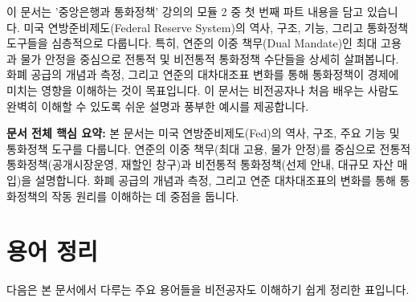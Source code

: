 \documentclass[11pt,a4paper]{book}
\theoremstyle{definition}
\begin{document}
이 문서는 '중앙은행과 통화정책' 강의의 모듈 2 중 첫 번째 파트 내용을 담고 있습니다.
미국 연방준비제도(Federal Reserve System)의 역사, 구조, 기능, 그리고 통화정책 도구들을 심층적으로 다룹니다.
특히, 연준의 이중 책무(Dual Mandate)인 최대 고용과 물가 안정을 중심으로 전통적 및 비전통적 통화정책 수단들을 상세히 살펴봅니다.
화폐 공급의 개념과 측정, 그리고 연준의 대차대조표 변화를 통해 통화정책이 경제에 미치는 영향을 이해하는 것이 목표입니다.
이 문서는 비전공자나 처음 배우는 사람도 완벽히 이해할 수 있도록 쉬운 설명과 풍부한 예시를 제공합니다.

\vspace{1em}

\begin{summarybox}
\textbf{문서 전체 핵심 요약:}
본 문서는 미국 연방준비제도(Fed)의 역사, 구조, 주요 기능 및 통화정책 도구를 다룹니다.
연준의 이중 책무(최대 고용, 물가 안정)를 중심으로 전통적 통화정책(공개시장운영, 재할인 창구)과 비전통적 통화정책(선제 안내, 대규모 자산 매입)을 설명합니다.
화폐 공급의 개념과 측정, 그리고 연준 대차대조표의 변화를 통해 통화정책의 작동 원리를 이해하는 데 중점을 둡니다.
\end{summarybox}

\section{용어 정리}

다음은 본 문서에서 다루는 주요 용어들을 비전공자도 이해하기 쉽게 정리한 표입니다.
\end{document}
